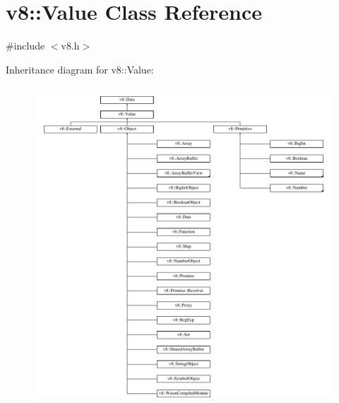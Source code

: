 \hypertarget{classv8_1_1Value}{}\section{v8\+:\+:Value Class Reference}
\label{classv8_1_1Value}


{\ttfamily \#include $<$v8.\+h$>$}

Inheritance diagram for v8\+:\+:Value\+:\begin{figure}[H]
\begin{center}
\leavevmode
\includegraphics[height=12.000000cm]{classv8_1_1Value}
\end{center}
\end{figure}
